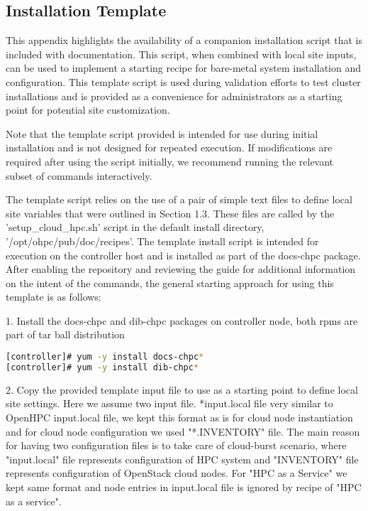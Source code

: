 \renewcommand\thesubsection{\Alph{subsection}}
\subsection{Installation Template}

This appendix highlights the availability of a companion installation script that is included with documentation. This script, when combined with local site inputs, can be used to implement a starting
recipe for bare-metal system installation and configuration. This template script is used during validation efforts to test cluster installations and is provided as a convenience for administrators as a starting point for potential site customization.
\begin{center}
	\begin{tcolorbox}[]
		\small
Note that the template script provided is intended for use during initial installation and is not designed for
repeated execution. If modifications are required after using the script initially, we recommend running the
relevant subset of commands interactively.
\end{tcolorbox}
\end{center}
The template script relies on the use of a pair of simple text files to define local site variables that were outlined
in Section 1.3. These files are called by the 'setup\_cloud\_hpc.sh' script in the default install directory, '/opt/ohpc/pub/doc/recipes'.
The template install script is intended for execution on the controller host and is installed as part of the docs-chpc package. After enabling the repository and reviewing the guide for additional information on the intent of the commands, the general starting approach for using this template
is as follows:


1. Install the docs-chpc and dib-chpc packages on controller node, both rpms are part of tar ball distribution

\begin{lstlisting}[language=bash,keywords={},upquote=true]
[controller]# yum -y install docs-chpc*
[controller]# yum -y install dib-chpc*
\end{lstlisting}

2. Copy the provided template input file to use as a starting point to define local site settings. Here we assume two input file. *input.local file very similar to OpenHPC input.local file, we kept this format as is for cloud node instantiation and for cloud node configuration we used "*.INVENTORY" file. The main reason for having two configuration files is to take care of cloud-burst scenario, where "input.local" file represents configuration of HPC system and "INVENTORY" file represents configuration of OpenStack cloud nodes. For "HPC as a Service" we kept same format and node entries in input.local file is ignored by recipe of "HPC as  a service".

